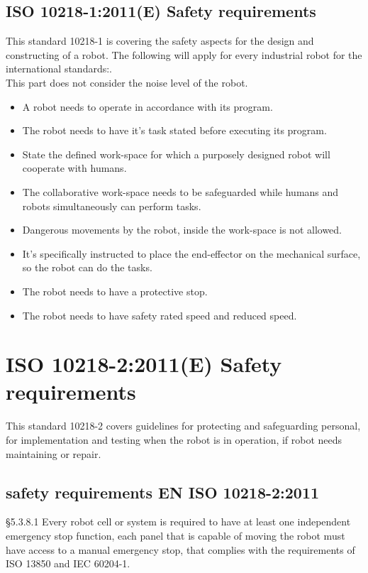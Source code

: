 \subsection{ISO 10218-1:2011(E) Safety requirements}
This standard 10218-1 is covering the safety aspects for the design and constructing of a robot.
The following will apply for every industrial robot for the international standards:\cite{Robotterdel1ds}.\\
This part does not consider the noise level of the robot.
\begin{itemize}
    \item A robot needs to operate in accordance with its program.
    \item The robot needs to have it's task stated before executing its program.
    \item State the defined work-space for which a purposely designed robot will cooperate with humans.
    \item The collaborative work-space needs to be safeguarded while humans and robots simultaneously can perform tasks.
    \item Dangerous movements by the robot, inside the work-space is not allowed.
    \item It's specifically instructed to place the end-effector on the mechanical surface, so the robot can do the tasks.
    \item The robot needs to have a protective stop.
    \item The robot needs to have safety rated speed and reduced speed.
\end{itemize}

\section{ISO 10218-2:2011(E) Safety requirements}
This standard 10218-2 covers guidelines for protecting and safeguarding personal, for implementation and testing when the robot is in operation, if robot needs maintaining or repair.

\subsection{safety requirements EN ISO 10218-2:2011}

\S5.3.8.1 Every robot cell or system is required to have at least one independent emergency stop function, each panel that is capable of moving the robot must have access to a manual emergency stop, that complies with the requirements of ISO 13850 and IEC 60204-1.\\ 


